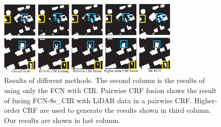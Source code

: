 \begin{figure}
\centering
\includegraphics[width=8.7cm]{Figures/Potsdam_compared_results.eps}
\caption{Results of different methods. The second column is the results of using only the FCN with CIR. Pairwise CRF fusion shows the result of fusing FCN-8s\_CIR with LiDAR data in a pairwise CRF. Higher-order CRF are used to generate the results shown in third column. Our results are shown in last colunm.}
\label{fig:Potsdam-compared-others}
\end{figure}
